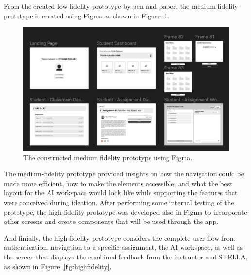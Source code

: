 \documentclass[sigconf,natbib=true]{acmart}
\begin{document}
From the created low-fidelity prototype by pen and paper, the medium-fidelity prototype is created using Figma as shown in Figure~\ref{fig:medfidelity}.

\begin{figure}[h]
  \centering
  \includegraphics[width=\linewidth]{med_fidelity.png}
  \caption{The constructed medium fidelity prototype using Figma.}\label{fig:medfidelity}
\end{figure} 

The medium-fidelity prototype provided insights on how the navigation could be made more efficient, how to make the elements accessible, and what the best layout for the AI workspace would look like while supporting the features that were conceived during ideation. After performing some internal testing of the prototype, the high-fidelity prototype was developed also in Figma to incorporate other screens and create components that will be used through the app.

And finially, the high-fidelity prototype considers the complete user flow from authentication, navigation to a specific assignment, the AI workspace, as well as the screen that displays the combined feedback from the instructor and STELLA, as shown in Figure~\ref{fig:highfidelity}.
\end{document}
